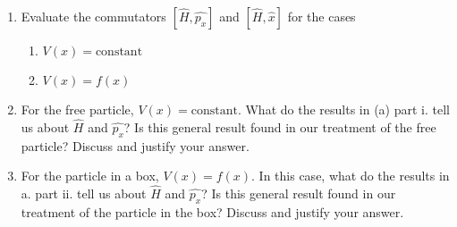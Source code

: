 \item \begin{enumerate}
    \item Evaluate the commutators $[\hat{H},\hat{p_x}]$ and $[\hat{H},\hat{x}]$ for the cases
          \begin{enumerate}
              \item $V(x)=\text{constant}$
              \item $V(x)=f(x)$
          \end{enumerate}
    \item For the free particle, $V(x)=\text{constant}$. What do the results in (a) part i. tell us about $\hat{H}$ and $\hat{p_x}$?
          Is this general result found in our treatment of the free particle? Discuss and justify your
          answer.
    \item For the particle in a box, $V(x)=f(x)$. In this case, what do the results in a. part ii. tell us about
          $\hat{H}$ and $\hat{p_x}$? Is this general result found in our treatment of the particle in the box? Discuss and
          justify your answer.
\end{enumerate}

